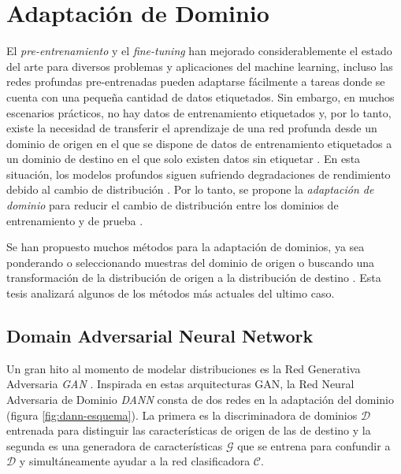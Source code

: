 \section{Adaptaci\'on de Dominio}
El {\it pre-entrenamiento} y el {\it fine-tuning} han mejorado considerablemente el estado del arte para diversos
problemas y aplicaciones del machine learning, incluso las redes profundas pre-entrenadas pueden adaptarse fácilmente a
tareas donde se cuenta con una pequeña cantidad de datos etiquetados. Sin embargo, en muchos escenarios prácticos, no
hay datos de entrenamiento etiquetados y, por lo tanto, existe la necesidad de transferir el aprendizaje de una red
profunda desde un dominio de origen en el que se dispone de datos de entrenamiento etiquetados a un dominio de destino
en el que solo existen datos sin etiquetar \parencite{glorot2011domain}. En esta situación, los modelos profundos siguen sufriendo degradaciones de rendimiento debido
al cambio de distribución \parencite{quinonero2008dataset}. Por lo tanto, se propone la {\it adaptación de dominio} para reducir el cambio de
distribución entre los dominios de entrenamiento y de prueba \parencite{jiang2022machine}.

Se han propuesto muchos métodos para la adaptación de dominios, ya sea ponderando o seleccionando muestras del dominio
de origen \parencite{sugiyama2007direct} o buscando una transformación de la distribución de origen a la distribución de destino \parencite{gong2013connecting}. Esta tesis analizar\'a algunos de los m\'etodos m\'as actuales del ultimo caso.

\subsection{Domain Adversarial Neural Network}
Un gran hito al momento de modelar distribuciones es la Red Generativa Adversaria {\it GAN} \parencite{goodfellow2020generative}. Inspirada en estas arquitecturas GAN, la Red Neural Adversaria de Dominio {\it DANN} \parencite{ganin2016domain} consta de dos redes en la adaptación del dominio (figura \ref{fig:dann-esquema}). La primera es
la discriminadora de dominios $\mathcal{D}$ entrenada para distinguir las características de origen de las de destino y
la segunda es una generadora de características $\mathcal{G}$ que se entrena para confundir a $\mathcal{D}$ y
simult\'aneamente ayudar a la red clasificadora $\mathcal{C}$.

